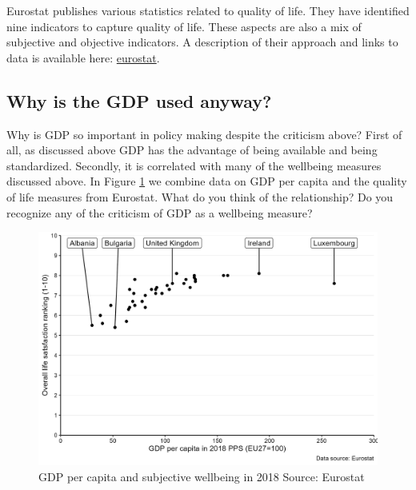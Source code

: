 \documentclass[
]{book}
\begin{document}
Eurostat publishes various statistics related to quality of life. They have identified nine indicators to capture quality of life. These aspects are also a mix of subjective and objective indicators. A description of their approach and links to data is available here: \href{http://ec.europa.eu/eurostat/statistics-explained/index.php/Quality_of_life_indicators_-_measuring_quality_of_life\#Overall_experience_of_life}{eurostat}.

\hypertarget{why-is-the-gdp-used-anyway}{%
\subsection*{Why is the GDP used anyway?}\label{why-is-the-gdp-used-anyway}}

Why is GDP so important in policy making despite the criticism above? First of all, as discussed above GDP has the advantage of being available and being standardized. Secondly, it is correlated with many of the wellbeing measures discussed above. In Figure \ref{fig:wb1} we combine data on GDP per capita and the quality of life measures from Eurostat. What do you think of the relationship? Do you recognize any of the criticism of GDP as a wellbeing measure?

\begin{figure}

{\centering \includegraphics[width=0.95\linewidth]{./resources/chapter_wellbeing/fig1} 

}

\caption{GDP per capita and subjective wellbeing in 2018 Source: Eurostat }\label{fig:wb1}
\end{figure}
\end{document}
